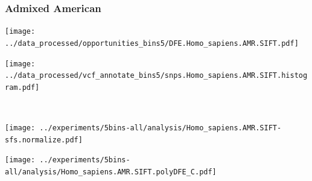 \subsubsection{Admixed American}

\begin{minipage}{0.49\linewidth}
    \texttt{[image: ../data\_processed/opportunities\_bins5/DFE.Homo\_sapiens.AMR.SIFT.pdf]}
\end{minipage}
\begin{minipage}{0.49\linewidth}
    \texttt{[image: ../data\_processed/vcf\_annotate\_bins5/snps.Homo\_sapiens.AMR.SIFT.histogram.pdf]}
\end{minipage}
\\
\begin{minipage}{0.49\linewidth}
    \texttt{[image: ../experiments/5bins-all/analysis/Homo\_sapiens.AMR.SIFT-sfs.normalize.pdf]}
\end{minipage}
\begin{minipage}{0.4\linewidth}
    \texttt{[image: ../experiments/5bins-all/analysis/Homo\_sapiens.AMR.SIFT.polyDFE\_C.pdf]}
\end{minipage}
